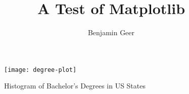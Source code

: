 \documentclass[a4paper]{article}
\title{A Test of Matplotlib}
\author{Benjamin Geer}
\begin{document}
\maketitle

\begin{figure}[h]
\begin{center}
\texttt{[image: degree-plot]}
\caption{Histogram of Bachelor's Degrees in US States}
\end{center}
\label{fig:farm}
\end{figure}
\end{document}
